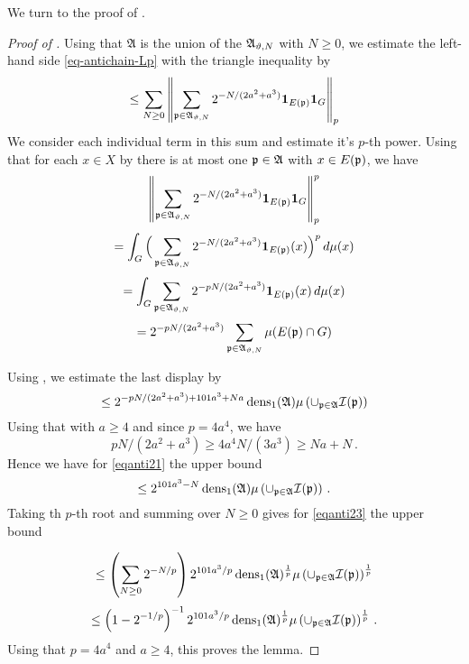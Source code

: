 We turn to the proof of .

\begin{proof}[Proof of ]

Using that $\mathfrak{A}$ is the union of the
$\mathfrak{A}_{{\vartheta},N}$ with $N\ge 0$,
we estimate the left-hand side \eqref{eq-antichain-Lp}
with the triangle inequality by
\begin{equation}\label{eqanti23}
\le \sum_{N\ge 0} \left\|\sum_{{\mathfrak p}\in \mathfrak{A}_{{\vartheta},N}} 2^{-N/(2a^2+a^3)}\mathbf{1}_{E({\mathfrak p})} \mathbf{1}_G\right\|_{p}
\end{equation}
We consider each individual term in this sum and estimate it's $p$-th power.
   Using that for each $x\in X$ by  there is at most one ${\mathfrak p}\in \mathfrak{A}$ with $x\in E({\mathfrak p})$,
 we have
 \begin{equation}
     \left\|\sum_{{\mathfrak p}\in \mathfrak{A}_{{\vartheta},N}} 2^{-N/(2a^2+a^3)}\mathbf{1}_{E({\mathfrak p})} \mathbf{1}_G\right\|_{p}^p
 \end{equation}
\begin{equation}
    =\int_G\Big(\sum_{{\mathfrak p}\in \mathfrak{A}_{{\vartheta},N}}2^{-N/(2a^2+a^3)}\mathbf{1}_{E({\mathfrak p})}(x)\Big)^p\, d\mu(x)
\end{equation}
\begin{equation}
  = \int _G\sum_{{\mathfrak p}\in\mathfrak{A}_{{\vartheta},N}}2^{-pN/(2a^2+a^3)}\mathbf{1}_{E({\mathfrak p})}(x)\, d\mu(x)
\end{equation}
\begin{equation}
  = 2^{-pN/(2a^2+a^3)} \sum_{{\mathfrak p}\in\mathfrak{A}_{{\vartheta},N}}\mu(E({\mathfrak p})\cap G)
\end{equation}

Using , we estimate the last display by
\begin{equation}\label{eqanti21}
    \le 2^{-pN/(2a^2+a^3)+101a^3+Na}\operatorname{\operatorname{dens}}_1(\mathfrak{A})\mu\left(\cup_{{\mathfrak p}\in\mathfrak{A}}{\mathcal{I}}({\mathfrak p})\right)
\end{equation}
Using that with $a\ge 4$ and since $p = 4a^4$, we have
\begin{equation}
    pN/(2a^2+a^3)\ge
    4a^4N/(3a^3) \ge Na+N\, .
\end{equation}
Hence we have for \eqref{eqanti21} the upper bound
\begin{equation}\label{eqanti22}
\le 2^{101a^3-N}\operatorname{\operatorname{dens}}_1(\mathfrak{A})\mu\left(\cup_{{\mathfrak p}\in\mathfrak{A}}{\mathcal{I}}({\mathfrak p})\right)\, .
\end{equation}
Taking th $p$-th root and summing over $N\ge 0$ gives for \eqref{eqanti23} the upper bound

\begin{equation}
\le \left(\sum_{N\ge 0} 2^{-N/p}\right)2^{101a^3/p}\operatorname{\operatorname{dens}}_1(\mathfrak{A})^{{\frac{1}{p}}}\mu\left(\cup_{{\mathfrak p}\in\mathfrak{A}}{\mathcal{I}}({\mathfrak p})\right)^{{\frac{1}{p}}}
\end{equation}
\begin{equation}
\le \left(1-2^{-1/p}\right)^{-1}
2^{101a^3/p}
\operatorname{\operatorname{dens}}_1(\mathfrak{A})^{\frac 1p}\mu\left(\cup_{{\mathfrak p}\in\mathfrak{A}}{\mathcal{I}}({\mathfrak p})\right)^{\frac 1p}\, .
\end{equation}
Using that $p = 4a^4$ and $a \ge 4$, this proves the lemma.
\end{proof}

